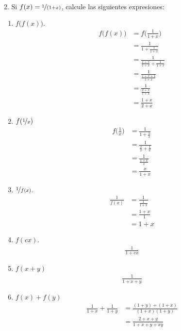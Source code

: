 \documentclass[11pt]{article}
\begin{document}
2. Si $f(x)=\nicefrac{1}{(1+x)}$, calcule las siguientes expresiones: \begin{enumerate}[label=\roman*)]
 \item $f\bigl(f(x)\bigr)$. \begin{align*}
  f\bigl(f(x)\bigr)&=f\biggl(\frac{1}{1+x}\biggr)\\
  &=\frac{1}{1+\frac{1}{1+x}}\\
  &=\frac{1}{\frac{1+x}{1+x}+\frac{1}{1+x}}\\
  &= \frac{1}{\frac{1+x+1}{1+x}}\\
  &= \frac{1}{\frac{2+x}{1+x}}\\
  &= \frac{1+x}{2+x}
 \end{align*}

 \item $f(\nicefrac{1}{x})$ \begin{align*}
  f\biggl(\frac{1}{x}\biggr) &= \frac{1}{1+\frac{1}{x}}\\
  &= \frac{1}{\frac{x}{x}+\frac{1}{x}}\\
  &= \frac{1}{\frac{1+x}{x}}\\
  &= \frac{x}{1+x}
 \end{align*}

 \item $\nicefrac{1}{f(x)}$.\begin{align*}
  \frac{1}{f(x)} &= \frac{1}{\frac{1}{1+x}}\\
  &=\frac{1+x}{1}\\
  &=1+x
 \end{align*}

 \item $f(cx)$. \begin{align*}
  \frac{1}{1+cx}
 \end{align*}

 \item $f(x+y)$ \begin{align*}
  \frac{1}{1+x+y}
 \end{align*}

 \item $f(x)+f(y)$ \begin{align*}
  \frac{1}{1+x} + \frac{1}{1+y} &= \frac{(1+y)+(1+x)}{(1+x)(1+y)}\\
  &= \frac{2+x+y}{1+x+y+xy}
 \end{align*}

\end{enumerate}
\end{document}
